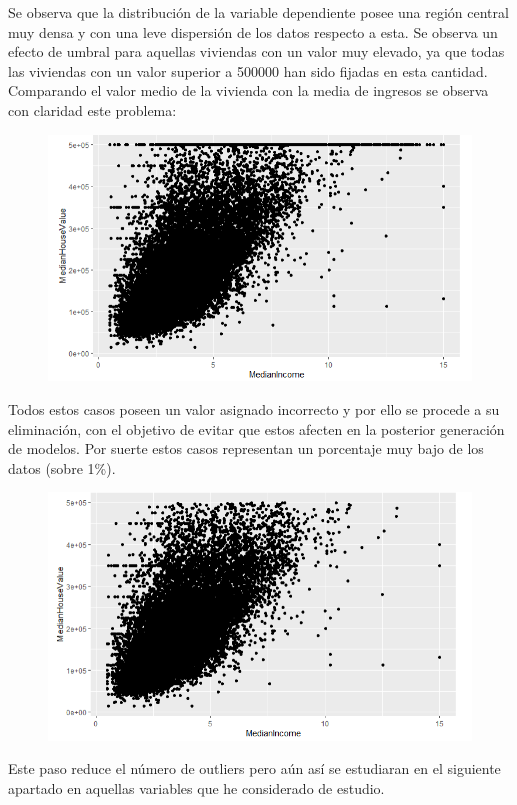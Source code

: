 Se observa que la distribución de la variable dependiente posee una región central muy densa y con una leve dispersión de los datos respecto a esta. Se observa un efecto de umbral para aquellas viviendas con un valor muy elevado, ya que todas las viviendas con un valor superior a 500000 han sido fijadas en esta cantidad. \\

Comparando el valor medio de la vivienda con la media de ingresos se observa con claridad este problema:
\newpage
\begin{figure}[h!]
	\centering
	\includegraphics[width=0.7\linewidth]{figures/truncado}
	\caption{}
	\label{fig:truncado}
\end{figure}

Todos estos casos poseen un valor asignado incorrecto y por ello se procede a su eliminación, con el objetivo de evitar que estos afecten en la posterior generación de modelos. Por suerte estos casos representan un porcentaje muy bajo de los datos (sobre 1\%).

\begin{figure}[h!]
	\centering
	\includegraphics[width=0.7\linewidth]{figures/post-truncado}
	\caption{}
	\label{fig:post-truncado}
\end{figure}



Este paso reduce el número de outliers pero aún así se estudiaran en el siguiente apartado en aquellas variables que he considerado de estudio.

